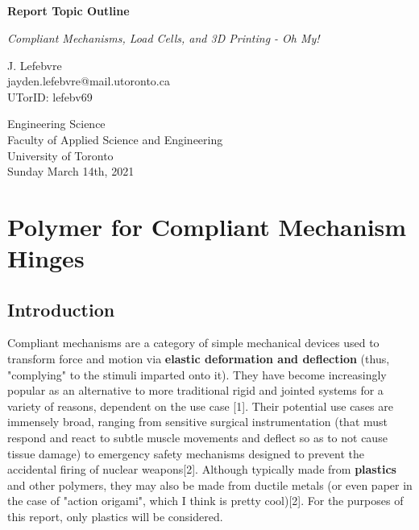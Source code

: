 \documentclass{report}
\title{\\\large{}}
\author{}
\begin{document}
\begin{titlepage}
    \begin{center}
        \vspace*{1cm}
 
        \textbf{Report Topic Outline}
 
        \vspace{0.5cm}
        \textit{Compliant Mechanisms, Load Cells, and 3D Printing - Oh My!}
             
        \vspace{1.5cm}
 
        J. Lefebvre\\\small{jayden.lefebvre@mail.utoronto.ca}\\\small{UTorID: lefebv69}
 
        \vfill
             
        \vspace{0.8cm}
             
        Engineering Science\\
        Faculty of Applied Science and Engineering\\
        University of Toronto\\
        Sunday March 14th, 2021
             
    \end{center}
 \end{titlepage}


\section{Polymer for Compliant Mechanism Hinges}

\subsection{Introduction}

Compliant mechanisms are a category of simple mechanical devices used to transform force and motion via \textbf{elastic deformation and deflection} (thus, "complying" to the stimuli imparted onto it).
They have become increasingly popular as an alternative to more traditional rigid and jointed systems for a variety of reasons, dependent on the use case [1].
Their potential use cases are immensely broad, ranging from sensitive surgical instrumentation (that must respond and react to subtle muscle movements and deflect so as to not cause tissue damage) to emergency safety mechanisms designed to prevent the accidental firing of nuclear weapons[2].
Although typically made from \textbf{plastics} and other polymers, they may also be made from ductile metals (or even paper in the case of "action origami", which I think is pretty cool)[2]. For the purposes of this report, only plastics will be considered.
\end{document}

